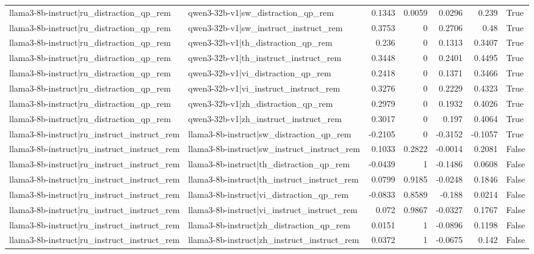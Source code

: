 \begin{table}
\begin{tabular}{l l r r r r l}
llama3-8b-instruct|ru_distraction_qp_rem & qwen3-32b-v1|sw_distraction_qp_rem & 0.1343 & 0.0059 & 0.0296 & 0.239 & True \\
llama3-8b-instruct|ru_distraction_qp_rem & qwen3-32b-v1|sw_instruct_instruct_rem & 0.3753 & 0 & 0.2706 & 0.48 & True \\
llama3-8b-instruct|ru_distraction_qp_rem & qwen3-32b-v1|th_distraction_qp_rem & 0.236 & 0 & 0.1313 & 0.3407 & True \\
llama3-8b-instruct|ru_distraction_qp_rem & qwen3-32b-v1|th_instruct_instruct_rem & 0.3448 & 0 & 0.2401 & 0.4495 & True \\
llama3-8b-instruct|ru_distraction_qp_rem & qwen3-32b-v1|vi_distraction_qp_rem & 0.2418 & 0 & 0.1371 & 0.3466 & True \\
llama3-8b-instruct|ru_distraction_qp_rem & qwen3-32b-v1|vi_instruct_instruct_rem & 0.3276 & 0 & 0.2229 & 0.4323 & True \\
llama3-8b-instruct|ru_distraction_qp_rem & qwen3-32b-v1|zh_distraction_qp_rem & 0.2979 & 0 & 0.1932 & 0.4026 & True \\
llama3-8b-instruct|ru_distraction_qp_rem & qwen3-32b-v1|zh_instruct_instruct_rem & 0.3017 & 0 & 0.197 & 0.4064 & True \\
llama3-8b-instruct|ru_instruct_instruct_rem & llama3-8b-instruct|sw_distraction_qp_rem & -0.2105 & 0 & -0.3152 & -0.1057 & True \\
llama3-8b-instruct|ru_instruct_instruct_rem & llama3-8b-instruct|sw_instruct_instruct_rem & 0.1033 & 0.2822 & -0.0014 & 0.2081 & False \\
llama3-8b-instruct|ru_instruct_instruct_rem & llama3-8b-instruct|th_distraction_qp_rem & -0.0439 & 1 & -0.1486 & 0.0608 & False \\
llama3-8b-instruct|ru_instruct_instruct_rem & llama3-8b-instruct|th_instruct_instruct_rem & 0.0799 & 0.9185 & -0.0248 & 0.1846 & False \\
llama3-8b-instruct|ru_instruct_instruct_rem & llama3-8b-instruct|vi_distraction_qp_rem & -0.0833 & 0.8589 & -0.188 & 0.0214 & False \\
llama3-8b-instruct|ru_instruct_instruct_rem & llama3-8b-instruct|vi_instruct_instruct_rem & 0.072 & 0.9867 & -0.0327 & 0.1767 & False \\
llama3-8b-instruct|ru_instruct_instruct_rem & llama3-8b-instruct|zh_distraction_qp_rem & 0.0151 & 1 & -0.0896 & 0.1198 & False \\
llama3-8b-instruct|ru_instruct_instruct_rem & llama3-8b-instruct|zh_instruct_instruct_rem & 0.0372 & 1 & -0.0675 & 0.142 & False \\

\end{tabular}
\end{table}
